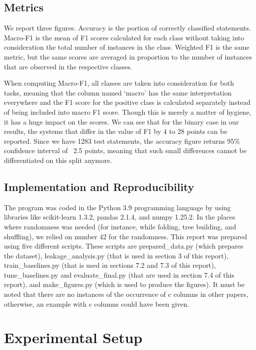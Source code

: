\documentclass[10pt,twocolumn,twoside,a4paper]{article}
\begin{document}
\subsection{Metrics}

We report three figures. Accuracy is the portion of correctly classified statements. Macro-F1 is the mean of F1 scores calculated for each class without taking into consideration the total number of instances in the class. Weighted F1 is the same metric, but the same scores are averaged in proportion to the number of instances that are observed in the respective classes.

When computing Macro-F1, all classes are taken into consideration for both tasks, meaning that the column named `macro' has the same interpretation everywhere and the F1 score for the positive class is calculated separately instead of being included into macro F1 score. Though this is merely a matter of hygiene, it has a huge impact on the scores. We can see that for the binary case in our results, the systems that differ in the value of F1 by 4 to 28 points can be reported. Since we have 1283 test statements, the accuracy figure returns 95\% confidence interval of ~2.5 points, meaning that such small differences cannot be differentiated on this split anymore.

\subsection{Implementation and Reproducibility}

The program was coded in the Python 3.9 programming language by using libraries like scikit-learn 1.3.2, pandas 2.1.4, and numpy 1.25.2. In the places where randomness was needed (for instance, while folding, tree building, and shuffling), we relied on number 42 for the randomness. This report was prepared using five different scripts. These scripts are prepared\_data.py (which prepares the dataset), leakage\_analysis.py (that is used in section 3 of this report), train\_baselines.py (that is used in sections 7.2 and 7.3 of this report), tune\_baselines.py and evaluate\_final.py (that are used in section 7.4 of this report), and make\_figures.py (which is used to produce the figures). It must be noted that there are no instances of the occurrence of c columns in other papers, otherwise, an example with c columns could have been given.

\section{Experimental Setup}
\end{document}
